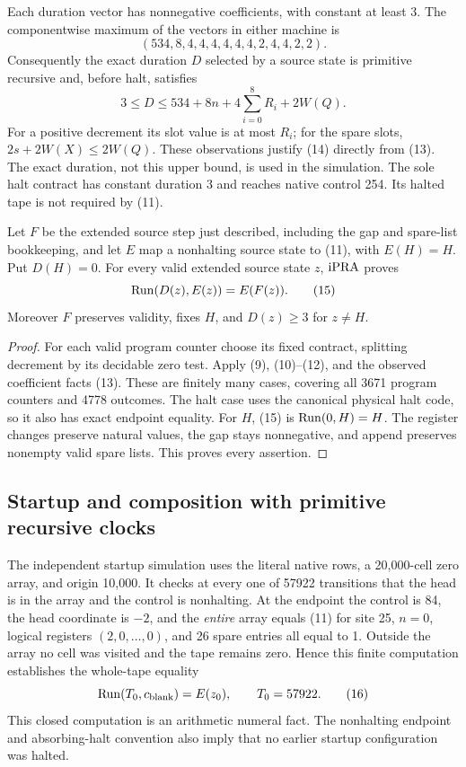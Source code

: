 Each duration vector has nonnegative coefficients, with constant at
least 3.  The componentwise maximum of the vectors in either machine is
\[
 (534,8,4,4,4,4,4,4,2,4,4,2,2).                                \tag{13}
\]
Consequently the exact duration $D$ selected by a source state is
primitive recursive and, before halt, satisfies
\[
 3\leq D\leq534+8n+4\sum_{i=0}^{8}R_i+2W(Q).                  \tag{14}
\]
For a positive decrement its slot value is at most $R_i$; for the spare
slots, $2s+2W(X)\leq2W(Q)$.  These observations justify (14) directly
from (13).  The exact duration, not this upper bound, is used in the
simulation.  The sole halt contract has constant duration 3 and reaches
native control 254.  Its halted tape is not required by (11).

\begin{proposition}
Let $F$ be the extended source step just described, including the gap
and spare-list bookkeeping, and let $E$ map a nonhalting source state
to (11), with $E(H)=H$.  Put $D(H)=0$.  For every valid extended source
state $z$, $\mathrm{iPRA}$ proves
\[
 \operatorname{Run}(D(z),E(z))=E(F(z)).                                       \tag{15}
\]
Moreover $F$ preserves validity, fixes $H$, and $D(z)\geq3$ for
$z\neq H$.
\end{proposition}

\begin{proof}
For each valid program counter choose its fixed contract, splitting
decrement by its decidable zero test.  Apply (9), (10)--(12), and the
observed coefficient facts (13).  These are finitely many cases, covering
all 3671 program counters and 4778 outcomes.  The halt case uses the
canonical physical halt code, so it also has exact endpoint equality.
For $H$, (15) is $\operatorname{Run}(0,H)=H$.  The register changes preserve natural
values, the gap stays nonnegative, and append preserves nonempty valid
spare lists.  This proves every assertion.
\end{proof}

\subsection{Startup and composition with primitive recursive clocks}

The independent startup simulation uses the literal native rows, a
20,000-cell zero array, and origin 10,000.  It checks at every one of
57922 transitions that the head is in the array and the control is
nonhalting.  At the endpoint the control is 84, the head coordinate is
$-2$, and the \emph{entire} array equals (11) for site 25, $n=0$,
logical registers $(2,0,\ldots,0)$, and 26 spare entries all equal to 1.
Outside the array no cell was visited and the tape remains zero.
Hence this finite computation establishes the whole-tape equality
\[
 \operatorname{Run}(T_0,c_{\rm blank})=E(z_0),\qquad T_0=57922.                \tag{16}
\]
This closed computation is an arithmetic numeral fact.  The nonhalting
endpoint and absorbing-halt convention also imply that no earlier
startup configuration was halted.

